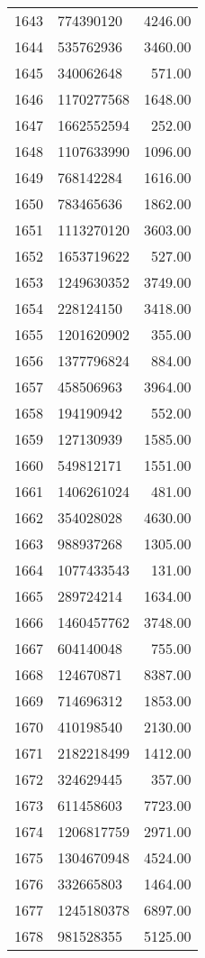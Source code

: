 \begin{table}[ht]
\begin{tabular}{rlr}
  1643 & 774390120 & 4246.00 \\ 
  1644 & 535762936 & 3460.00 \\ 
  1645 & 340062648 & 571.00 \\ 
  1646 & 1170277568 & 1648.00 \\ 
  1647 & 1662552594 & 252.00 \\ 
  1648 & 1107633990 & 1096.00 \\ 
  1649 & 768142284 & 1616.00 \\ 
  1650 & 783465636 & 1862.00 \\ 
  1651 & 1113270120 & 3603.00 \\ 
  1652 & 1653719622 & 527.00 \\ 
  1653 & 1249630352 & 3749.00 \\ 
  1654 & 228124150 & 3418.00 \\ 
  1655 & 1201620902 & 355.00 \\ 
  1656 & 1377796824 & 884.00 \\ 
  1657 & 458506963 & 3964.00 \\ 
  1658 & 194190942 & 552.00 \\ 
  1659 & 127130939 & 1585.00 \\ 
  1660 & 549812171 & 1551.00 \\ 
  1661 & 1406261024 & 481.00 \\ 
  1662 & 354028028 & 4630.00 \\ 
  1663 & 988937268 & 1305.00 \\ 
  1664 & 1077433543 & 131.00 \\ 
  1665 & 289724214 & 1634.00 \\ 
  1666 & 1460457762 & 3748.00 \\ 
  1667 & 604140048 & 755.00 \\ 
  1668 & 124670871 & 8387.00 \\ 
  1669 & 714696312 & 1853.00 \\ 
  1670 & 410198540 & 2130.00 \\ 
  1671 & 2182218499 & 1412.00 \\ 
  1672 & 324629445 & 357.00 \\ 
  1673 & 611458603 & 7723.00 \\ 
  1674 & 1206817759 & 2971.00 \\ 
  1675 & 1304670948 & 4524.00 \\ 
  1676 & 332665803 & 1464.00 \\ 
  1677 & 1245180378 & 6897.00 \\ 
  1678 & 981528355 & 5125.00 \\ 

\end{tabular}
\end{table}
